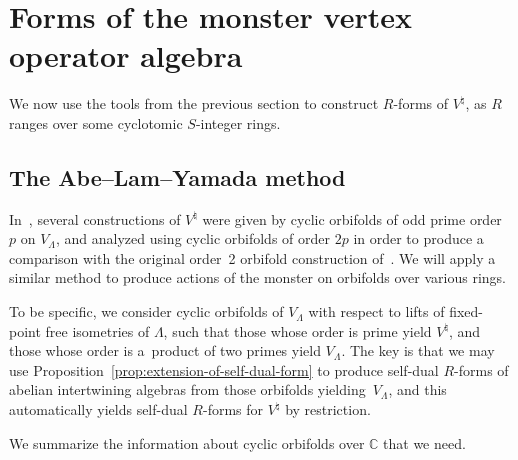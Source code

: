 \documentclass[pdftex]{sigma}
\newcommand{\bC}{\mathbb{C}}
\theoremstyle{definition}
\begin{document}
\section{Forms of the monster vertex operator algebra}

We now use the tools from the previous section to construct $R$-forms of $V^\natural$, as $R$ ranges over some cyclotomic $S$-integer rings.

\subsection{The Abe--Lam--Yamada method}

In~\cite{ALY17}, several constructions of $V^\natural$ were given by cyclic orbifolds of odd prime order $p$ on $V_\Lambda$, and analyzed using cyclic orbifolds of order $2p$ in order to produce a comparison with the original order~2 orbifold construction of~\cite{FLM88}. We will apply a similar method to produce actions of the monster on orbifolds over various rings.

To be specific, we consider cyclic orbifolds of $V_\Lambda$ with respect to lifts of fixed-point free isometries of $\Lambda$, such that those whose order is prime yield $V^\natural$, and those whose order is a~product of two primes yield $V_\Lambda$. The key is that we may use Proposition~\ref{prop:extension-of-self-dual-form} to produce self-dual $R$-forms of abelian intertwining algebras from those orbifolds yielding~$V_\Lambda$, and this automatically yields self-dual $R$-forms for $V^\natural$ by restriction.

We summarize the information about cyclic orbifolds over $\bC$ that we need.
\end{document}
